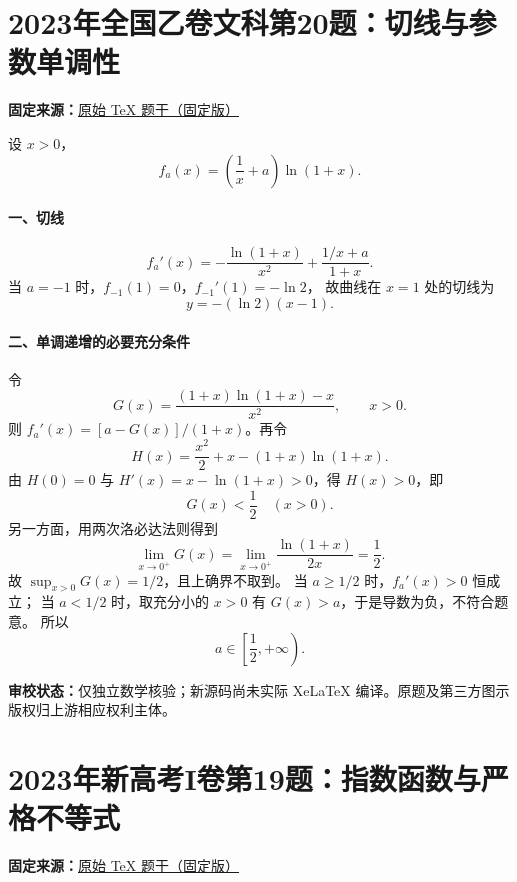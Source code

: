 \documentclass[UTF8,a4paper,11pt]{ctexart}
\begin{document}
\section*{2023年全国乙卷文科第20题：切线与参数单调性}
\noindent\textbf{固定来源：}\href{https://github.com/DxAThing/Gaokao-Math-Problems-Compilation/blob/f1ae169b58a75b3db6e35c670b3f0d5c78718188/content/2023/national_paper_b_liberal.tex#L246}{原始 TeX 题干（固定版）}

设 $x>0$，
\[
f_a(x)=\left(\frac1x+a\right)\ln(1+x).
\]

\paragraph{一、切线}
\[
f_a'(x)=-\frac{\ln(1+x)}{x^2}
          +\frac{1/x+a}{1+x}.
\]
当 $a=-1$ 时，$f_{-1}(1)=0$，$f_{-1}'(1)=-\ln2$，
故曲线在 $x=1$ 处的切线为
\[
\boxed{y=-(\ln2)(x-1)}.
\]

\paragraph{二、单调递增的必要充分条件}
令
\[
G(x)=\frac{(1+x)\ln(1+x)-x}{x^2},\qquad x>0.
\]
则 $f_a'(x)=[a-G(x)]/(1+x)$。再令
\[
H(x)=\frac{x^2}{2}+x-(1+x)\ln(1+x).
\]
由 $H(0)=0$ 与 $H'(x)=x-\ln(1+x)>0$，得
$H(x)>0$，即
\[
G(x)<\frac12\quad(x>0).
\]
另一方面，用两次洛必达法则得到
\[
\lim_{x\to0^+}G(x)
 =\lim_{x\to0^+}\frac{\ln(1+x)}{2x}
 =\frac12.
\]
故 $\sup_{x>0}G(x)=1/2$，且上确界不取到。
当 $a\ge1/2$ 时，$f_a'(x)>0$ 恒成立；
当 $a<1/2$ 时，取充分小的 $x>0$ 有
$G(x)>a$，于是导数为负，不符合题意。
所以
\[
\boxed{a\in\left[\frac12,+\infty\right)}.
\]

\bigskip
\noindent\textbf{审校状态：}仅独立数学核验；新源码尚未实际
XeLaTeX 编译。原题及第三方图示版权归上游相应权利主体。

\clearpage
{}
{}
\section*{2023年新高考I卷第19题：指数函数与严格不等式}
\noindent\textbf{固定来源：}\href{https://github.com/DxAThing/Gaokao-Math-Problems-Compilation/blob/f1ae169b58a75b3db6e35c670b3f0d5c78718188/content/2023/new_gaokao_paper_1.tex#L554}{原始 TeX 题干（固定版）}
\end{document}
